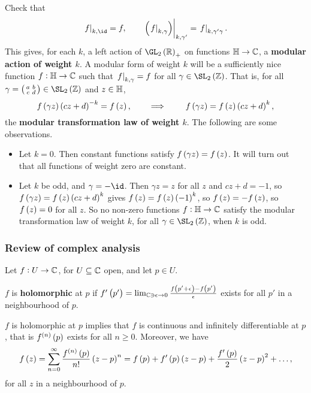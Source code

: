 Check that
$$ \eval{f}_{k, \id} = f, \qquad \eval{\br{\eval{f}_{k, \gamma}}}_{k, \gamma'} = \eval{f}_{k, \gamma'\gamma}. $$
This gives, for each $ k $, a left action of $ \GL_2\br{\RR}_+ $ on functions $ \mathbb{H} \to \mathbb{C} $, a \textbf{modular action of weight $ k $}. A modular form of weight $ k $ will be a sufficiently nice function $ f : \mathbb{H} \to \mathbb{C} $ such that $ \left. f \right|_{k, \gamma} = f $ for all $ \gamma \in \SL_2\br{\ZZ} $. That is, for all $ \gamma = \twobytwosmall{a}{b}{c}{d} \in \SL_2\br{\ZZ} $ and $ z \in \mathbb{H} $,
$$ f\br{\gamma z}\br{cz + d}^{-k} = f\br{z}, \qquad \implies \qquad f\br{\gamma z} = f\br{z}\br{cz + d}^k, $$
the \textbf{modular transformation law of weight $ k $}. The following are some observations.
\begin{itemize}
\item Let $ k = 0 $. Then constant functions satisfy $ f\br{\gamma z} = f\br{z} $. It will turn out that all functions of weight zero are constant.
\item Let $ k $ be odd, and $ \gamma = -\id $. Then $ \gamma z = z $ for all $ z $ and $ cz + d = -1 $, so $ f\br{\gamma z} = f\br{z}\br{cz + d}^k $ gives $ f\br{z} = f\br{z}\br{-1}^k $, so $ f\br{z} = -f\br{z} $, so $ f\br{z} = 0 $ for all $ z $. So no non-zero functions $ f : \mathbb{H} \to \mathbb{C} $ satisfy the modular transformation law of weight $ k $, for all $ \gamma \in \SL_2\br{\ZZ} $, when $ k $ is odd.
\end{itemize}

\pagebreak

\subsubsection{Review of complex analysis}

Let $ f : U \to \mathbb{C} $, for $ U \subseteq \mathbb{C} $ open, and let $ p \in U $.

\begin{definition}
$ f $ is \textbf{holomorphic} at $ p $ if $ f'\br{p'} = \lim_{\CC \ni \epsilon \to 0} \tfrac{f\br{p' + \epsilon} - f\br{p'}}{\epsilon} $ exists for all $ p' $ in a neighbourhood of $ p $.
\end{definition}

\begin{proposition}
$ f $ is holomorphic at $ p $ implies that $ f $ is continuous and infinitely differentiable at $ p $, that is $ f^{\br{n}}\br{p} $ exists for all $ n \ge 0 $. Moreover, we have
$$ f\br{z} = \sum_{n = 0}^\infty \dfrac{f^{\br{n}}\br{p}}{n!}\br{z - p}^n = f\br{p} + f'\br{p}\br{z - p} + \dfrac{f'\br{p}}{2}\br{z - p}^2 + \dots, $$
for all $ z $ in a neighbourhood of $ p $.
\end{proposition}

